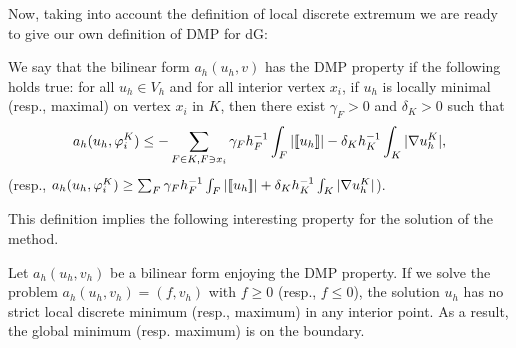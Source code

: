Now, taking into account the definition of local discrete extremum we are ready to give our own definition of DMP for dG:
\begin{definition}[DMP dG]
 We say that the bilinear form $a_h(u_h,v)$ has the DMP property if the following holds true: for all $u_h\in V_h$ and for all interior vertex $x_i$, if $u_h$ is locally minimal (resp., maximal) on vertex $x_i$ in $K$, then there exist $\gamma_F>0$ and $\delta_K >0$ such that  
 \begin{equation}\label{eq-dmpdg}
 a_h(u_h,\varphi_i^K)\leq -   \sum _{F\in K, F\ni x_i}  \gamma_F {h}^{-1}_F \int_F |\lbrack\!\lbrack u_h \rbrack\!\rbrack| - \delta_K h_K^{-1} \int_K |\nabla u^K_{h}|,
 \end{equation}  
 (resp., $ a_h(u_h,\varphi_i^K)\geq   \sum _{F} \gamma_F {h}^{-1}_F\int_F |\lbrack\!\lbrack u_h \rbrack\!\rbrack| + \delta_K h_K^{-1} \int_K |\nabla u^K_{h}|$).
\end{definition}
This definition implies the following interesting property for the solution of the method.
\begin{lemma} \label{lemma1}
Let $a_h(u_h,v_h)$ be a bilinear form enjoying the DMP property. If we solve the problem $a_h(u_h,v_h) = (f,v_h)$ with $f\geq 0$ (resp., $f\leq 0$), the solution $u_h$ has no strict local discrete minimum (resp., maximum) in any interior point. As a result, the global minimum (resp. maximum) is on the boundary. 
\end{lemma}
